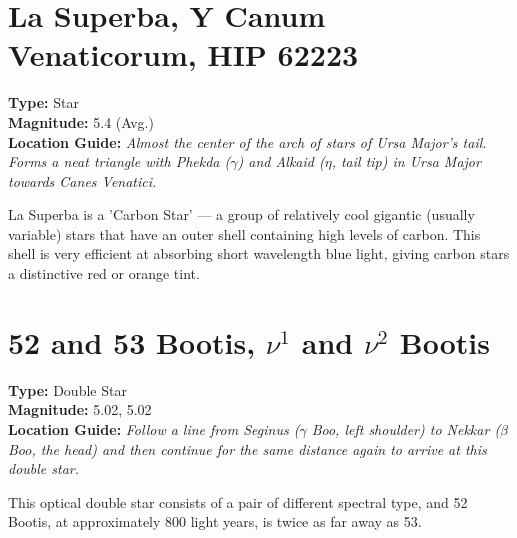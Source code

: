 \section{La Superba, Y Canum Venaticorum, HIP 62223}
\textbf{Type:} Star \\
\textbf{Magnitude:} 5.4 (Avg.) \\
\textbf{Location Guide:} \textit{Almost the center of the arch of stars of Ursa Major's tail. Forms a neat triangle with Phekda ($\gamma$) and Alkaid ($\eta$, tail tip) in Ursa Major towards Canes Venatici.} 

La Superba is a 'Carbon Star' --- a group of relatively cool gigantic
(usually variable) stars that have an outer shell containing high
levels of carbon. This shell is very efficient at absorbing short
wavelength blue light, giving carbon stars a distinctive red or orange
tint.

\section{52 and 53 Bootis, $\nu^1$ and $\nu^2$ Bootis} 
\textbf{Type:} Double Star \\
\textbf{Magnitude:} 5.02, 5.02 \\
\textbf{Location Guide:} \textit{Follow a line from Seginus ($\gamma$ Boo, left shoulder) to Nekkar ($\beta$ Boo, the head) and then continue for the same distance again to arrive at this double star.} 

This optical double star consists of a pair of different spectral type, and 52 Bootis, at
approximately 800 light years, is twice as far away as 53.


